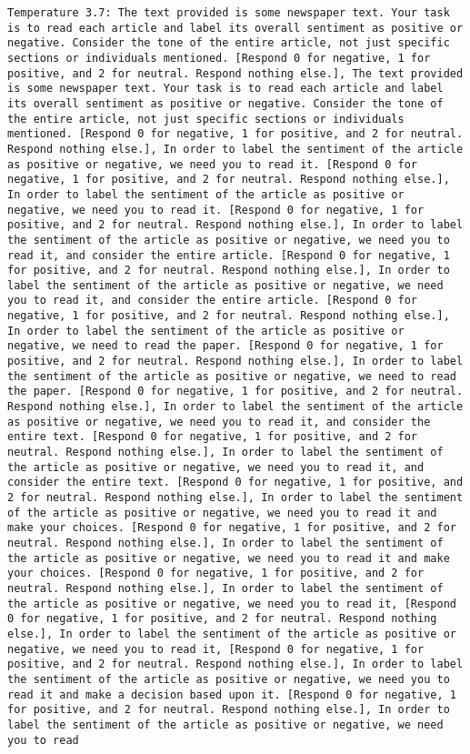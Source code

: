\begin{lstlisting}[label=lst:poor_performing_prompts]
	Temperature 3.7: The text provided is some newspaper text. Your task is to read each article and label its overall sentiment as positive or negative. Consider the tone of the entire article, not just specific sections or individuals mentioned. [Respond 0 for negative, 1 for positive, and 2 for neutral. Respond nothing else.], The text provided is some newspaper text. Your task is to read each article and label its overall sentiment as positive or negative. Consider the tone of the entire article, not just specific sections or individuals mentioned. [Respond 0 for negative, 1 for positive, and 2 for neutral. Respond nothing else.], In order to label the sentiment of the article as positive or negative, we need you to read it. [Respond 0 for negative, 1 for positive, and 2 for neutral. Respond nothing else.], In order to label the sentiment of the article as positive or negative, we need you to read it. [Respond 0 for negative, 1 for positive, and 2 for neutral. Respond nothing else.], In order to label the sentiment of the article as positive or negative, we need you to read it, and consider the entire article. [Respond 0 for negative, 1 for positive, and 2 for neutral. Respond nothing else.], In order to label the sentiment of the article as positive or negative, we need you to read it, and consider the entire article. [Respond 0 for negative, 1 for positive, and 2 for neutral. Respond nothing else.], In order to label the sentiment of the article as positive or negative, we need to read the paper. [Respond 0 for negative, 1 for positive, and 2 for neutral. Respond nothing else.], In order to label the sentiment of the article as positive or negative, we need to read the paper. [Respond 0 for negative, 1 for positive, and 2 for neutral. Respond nothing else.], In order to label the sentiment of the article as positive or negative, we need you to read it, and consider the entire text. [Respond 0 for negative, 1 for positive, and 2 for neutral. Respond nothing else.], In order to label the sentiment of the article as positive or negative, we need you to read it, and consider the entire text. [Respond 0 for negative, 1 for positive, and 2 for neutral. Respond nothing else.], In order to label the sentiment of the article as positive or negative, we need you to read it and make your choices. [Respond 0 for negative, 1 for positive, and 2 for neutral. Respond nothing else.], In order to label the sentiment of the article as positive or negative, we need you to read it and make your choices. [Respond 0 for negative, 1 for positive, and 2 for neutral. Respond nothing else.], In order to label the sentiment of the article as positive or negative, we need you to read it, [Respond 0 for negative, 1 for positive, and 2 for neutral. Respond nothing else.], In order to label the sentiment of the article as positive or negative, we need you to read it, [Respond 0 for negative, 1 for positive, and 2 for neutral. Respond nothing else.], In order to label the sentiment of the article as positive or negative, we need you to read it and make a decision based upon it. [Respond 0 for negative, 1 for positive, and 2 for neutral. Respond nothing else.], In order to label the sentiment of the article as positive or negative, we need you to read 
\end{lstlisting}

